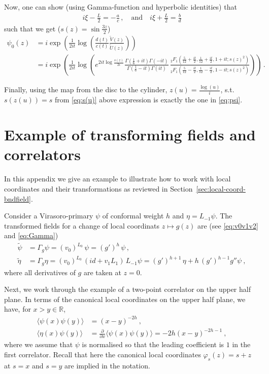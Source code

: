 \documentclass[11pt,a4paper]{article}
\numberwithin{equation}{section}
\begin{document}
\noindent 
Now, one can show (using Gamma-function and hyperbolic identities) that 
%
\begin{align}
    i\xi -\frac{L}{2} = -\frac{a}{c}\,, \quad \text{and} \quad i\xi + \frac{L}{2} = \frac{b}{d}
\end{align}
%
such that we get ($s(z) = \sin\frac{3z}{2}$)
%
\begin{align}
    \psi_0(z) &= i \exp\left(\frac{1}{2it} \log\left(\frac{d(t)}{c(t)}\frac{\tilde{V}(z)}{\tilde{U}(z)}\right)\right)\\
            &= i \exp\!\left(\frac{1}{2it} \log\!\left(e^{2it\log\frac{s(z)}{2i}} \frac{\Gamma\!\left(\frac{1}{6}\!+\!it\right)\Gamma\!\left(-it\right)}{\Gamma\!\left(\frac{1}{6}\!-\!it\right)\Gamma\!\left(it\right)}\,\frac{_2F_1\!\left(\frac{5}{12}\!+\!\frac{it}2,\frac{1}{12}\!+\!\frac{i t}2,1\!+\!i t; s(z)^2\right)}{_2F_1\!\left(\frac{5}{12}\!-\!\frac{i t}2,\frac{1}{12}\!-\!\frac{i t}2,1\!-\!i t; s(z)^2\right)}\right)\right)\,.\nonumber
\end{align}

\noindent 
Finally, using the map from the disc to the cylinder, $z(u) = \frac{\log(u)}{i}$, s.t. $s(z(u)) = s$ from \eqref{eq:s(u)} above expression is exactly the one in \eqref{eq:psi}. 


\section{Example of transforming fields and correlators}\label{app:TrafoExamples}

In this appendix we give an example to illustrate how to work with local coordinates and their transformations as reviewed in Section~\ref{sec:local-coord-bndfield}.
    
Consider a Virasoro-primary $\psi$ of conformal weight $h$ and $\eta = L_{-1} \psi$. The transformed fields for a change of local coordinats $z \mapsto g(z)$ are (see \eqref{eq:v0v1v2} and \eqref{eq:Gamma})
%
\begin{align}
	\tilde\psi &= \Gamma_g \psi = (v_0)^{L_0} \, \psi = (g')^{h} \, \psi \,,
\nonumber\\	
	\tilde\eta &= \Gamma_g \eta = (v_0)^{L_0} \, (id + v_1 L_1) \, L_{-1}\psi 
	= (g')^{h+1} \,\eta + h \,(g')^{h-1} g'' \psi~,
\end{align}
%
where all derivatives of $g$ are taken at $z=0$.

Next, we work through the example of a two-point correlator on the upper half plane. In terms of the canonical local coordinates on the upper half plane, we have, for $x>y \in \mathbb{R}$,
\begin{align}
\big\langle  \psi(x) \psi(y) \big\rangle &= (x-y)^{-2h} ~,
\nonumber\\	
\big\langle  \eta(x) \psi(y) \big\rangle &= 
\frac{\partial}{\partial x}\big\langle  \psi(x) \psi(y) \big\rangle = -2h (x-y)^{-2h-1}~,
\label{eq:local-coord-example1}
\end{align}
where we assume that $\psi$ is normalised so that the leading coefficient is $1$ in the first correlator. Recall that here the canonical local coordinates $\varphi_s(z) = s+z$ at $s=x$ and $s=y$ are implied in the notation.
\end{document}
